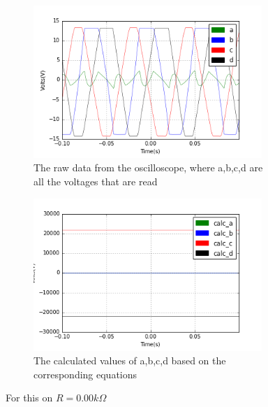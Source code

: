 \begin{figure}[h!]
\centering
\begin{subfigure}[t]{.475\textwidth}
  \centering
  \includegraphics[width=0.95\textwidth, height=0.25\textheight]{figures/DHO/scope_35raw.png}
  \caption{The raw data from the oscilloscope, where a,b,c,d are all the voltages that are read}
 \label{fig:sum_7_og_data}
\end{subfigure}\hfill
\begin{subfigure}[t]{.475\textwidth}
  \centering
  \includegraphics[width=0.95\textwidth, height=0.25\textheight]{figures/DHO/scope_35calc.png}
  \caption{The calculated values of a,b,c,d based on the corresponding equations}
\label{fig:sum_7_calc_data}
\end{subfigure}
\caption{For this on $R = 0.00k\Omega$}
\label{fig:sum_7}
\end{figure}

